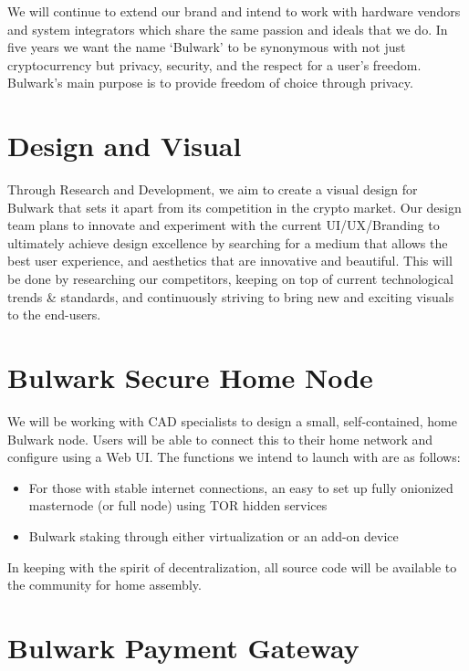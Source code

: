 \documentclass[11pt,a4paperpaper,]{report}
\providecommand{\tightlist}{%
  \setlength{\itemsep}{0pt}\setlength{\parskip}{0pt}}
\begin{document}
We will continue to extend our brand and intend to work with hardware
vendors and system integrators which share the same passion and ideals
that we do. In five years we want the name `Bulwark' to be synonymous
with not just cryptocurrency but privacy, security, and the respect for
a user's freedom. Bulwark's main purpose is to provide freedom of choice
through privacy.

\section{Design and Visual}\label{design-and-visual}

Through Research and Development, we aim to create a visual design for
Bulwark that sets it apart from its competition in the crypto market.
Our design team plans to innovate and experiment with the current
UI/UX/Branding to ultimately achieve design excellence by searching for
a medium that allows the best user experience, and aesthetics that are
innovative and beautiful. This will be done by researching our
competitors, keeping on top of current technological trends \&
standards, and continuously striving to bring new and exciting visuals
to the end-users.

\section{Bulwark Secure Home Node}\label{bulwark-secure-home-node}

We will be working with CAD specialists to design a small,
self-contained, home Bulwark node. Users will be able to connect this to
their home network and configure using a Web UI. The functions we intend
to launch with are as follows:

\begin{itemize}
\tightlist
\item
  For those with stable internet connections, an easy to set up fully
  onionized masternode (or full node) using TOR hidden services
\item
  Bulwark staking through either virtualization or an add-on device
\end{itemize}

In keeping with the spirit of decentralization, all source code will be
available to the community for home assembly.

\section{Bulwark Payment Gateway}\label{bulwark-payment-gateway}
\end{document}
